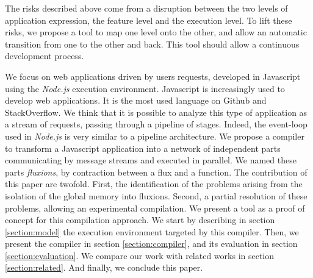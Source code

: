 The risks described above come from a disruption between the two levels of application expression, the feature level and the execution level.
To lift these risks, we propose a tool to map one level onto the other, and allow an automatic transition from one to the other and back.
This tool should allow a continuous development process.

We focus on web applications driven by users requests, developed in Javascript using the \textit{Node.js} execution environment.
Javascript is increasingly used to develop web applications.
It is the most used language on Github and StackOverflow.
We think that it is possible to analyze this type of application as a stream of requests, passing through a pipeline of stages.
Indeed, the event-loop used in \textit{Node.js} is very similar to a pipeline architecture.
We propose a compiler to transform a Javascript application into a network of independent parts communicating by message streams and executed in parallel.
We named these parts \textit{fluxions}, by contraction between a flux and a function.
The contribution of this paper are twofold.
First, the identification of the problems arising from the isolation of the global memory into fluxions.
Second, a partial resolution of these problems, allowing an experimental compilation.
We present %
a tool as a proof of concept for this compilation approach.
We start by describing in section \ref{section:model} the execution environment targeted by this compiler.
Then, we present the compiler in section \ref{section:compiler}, and its evaluation in section \ref{section:evaluation}.
We compare our work with related works in section \ref{section:related}.
And finally, we conclude this paper.